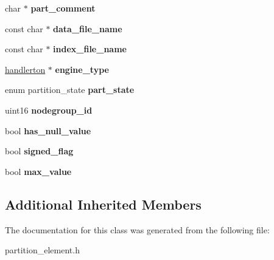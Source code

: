 \begin{DoxyCompactItemize}
char $\ast$ {\bfseries part\+\_\+comment}
\item 
\mbox{\label{classpartition__element_ae8f63dbc9b6b4ef5ee6db2148151ce59}} 
const char $\ast$ {\bfseries data\+\_\+file\+\_\+name}
\item 
\mbox{\label{classpartition__element_a08744b384dfde9cd09cb0dceff0631df}} 
const char $\ast$ {\bfseries index\+\_\+file\+\_\+name}
\item 
\mbox{\label{classpartition__element_a6123806ad7aa8ba06301bc81e1fa1e3a}} 
\mbox{\hyperlink{structhandlerton}{handlerton}} $\ast$ {\bfseries engine\+\_\+type}
\item 
\mbox{\label{classpartition__element_ab5e117d449c56aaf768aade854d8c43f}} 
enum partition\+\_\+state {\bfseries part\+\_\+state}
\item 
\mbox{\label{classpartition__element_adaf5655ae2fcc61765fd40d552b95431}} 
uint16 {\bfseries nodegroup\+\_\+id}
\item 
\mbox{\label{classpartition__element_ad341dcd6b92a614ac9a90dc548c6541e}} 
bool {\bfseries has\+\_\+null\+\_\+value}
\item 
\mbox{\label{classpartition__element_a84b26dbf931349e3e4684602af3a5e72}} 
bool {\bfseries signed\+\_\+flag}
\item 
\mbox{\label{classpartition__element_a64aa8b7bda1b965064e3252143db3b33}} 
bool {\bfseries max\+\_\+value}
\end{DoxyCompactItemize}
\subsection*{Additional Inherited Members}


The documentation for this class was generated from the following file\+:\begin{DoxyCompactItemize}
\item 
partition\+\_\+element.\+h\end{DoxyCompactItemize}
